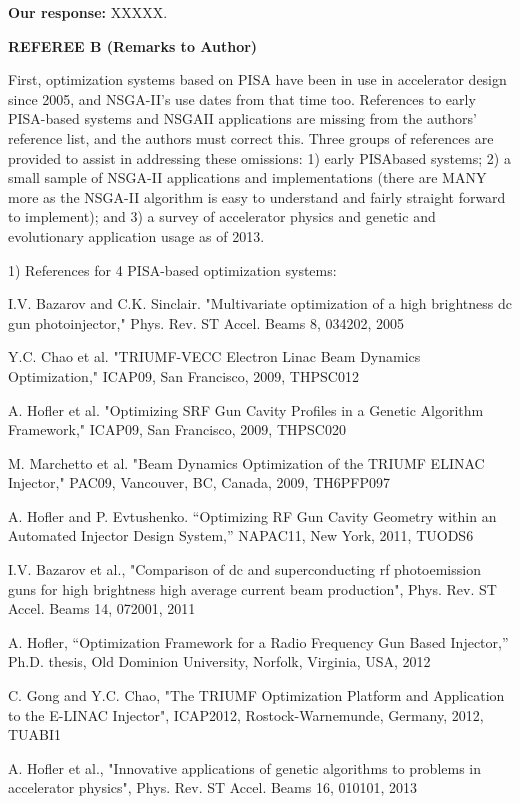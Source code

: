 \documentclass{article}
\begin{document}
{\bf Our response:} {\color{blue} XXXXX.}



{\bf REFEREE B (Remarks to Author)}

First, optimization systems based on PISA have been in use in
accelerator design since 2005, and NSGA-II’s use dates from that time
too. References to early PISA-based systems and NSGAII applications
are missing from the authors’ reference list, and the authors must
correct this. Three groups of references are provided to assist in
addressing these omissions: 1) early PISAbased systems; 2) a small
sample of NSGA-II applications and implementations (there are MANY
more as the NSGA-II algorithm is easy to understand and fairly
straight forward to implement); and 3) a survey of accelerator physics
and genetic and evolutionary application usage as of 2013.

1) References for 4 PISA-based optimization systems:

I.V. Bazarov and C.K. Sinclair. "Multivariate optimization of a high
brightness dc gun photoinjector," Phys. Rev. ST Accel. Beams 8,
034202, 2005

Y.C. Chao et al. "TRIUMF-VECC Electron Linac Beam Dynamics
Optimization," ICAP09, San Francisco, 2009, THPSC012

A. Hofler et al. "Optimizing SRF Gun Cavity Profiles in a Genetic
Algorithm Framework," ICAP09, San Francisco, 2009, THPSC020

M. Marchetto et al. "Beam Dynamics Optimization of the TRIUMF ELINAC
Injector," PAC09, Vancouver, BC, Canada, 2009, TH6PFP097

A. Hofler and P. Evtushenko. “Optimizing RF Gun Cavity Geometry within
an Automated Injector Design System,” NAPAC11, New York, 2011, TUODS6

I.V. Bazarov et al., "Comparison of dc and superconducting rf
photoemission guns for high brightness high average current beam
production", Phys. Rev. ST Accel. Beams 14, 072001, 2011

A. Hofler, “Optimization Framework for a Radio Frequency Gun Based
Injector,” Ph.D. thesis, Old Dominion University, Norfolk, Virginia,
USA, 2012

C. Gong and Y.C. Chao, "The TRIUMF Optimization Platform and
Application to the E-LINAC Injector", ICAP2012, Rostock-Warnemunde,
Germany, 2012, TUABI1

A. Hofler et al., "Innovative applications of genetic algorithms to
problems in accelerator physics", Phys. Rev. ST Accel. Beams 16,
010101, 2013
\end{document}
